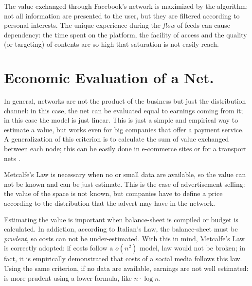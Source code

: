 \documentclass[12pt, a4page]{article}
\begin{document}
The value exchanged through Facebook's network is maximized by the algorithm: not all information are presented to the user, but they are filtered according to personal interests.
The unique experience during the \textit{flow} of feeds can cause dependency: the time spent on the platform, the facility of access and the quality (or targeting) of contents are so high that saturation is not easily reach. \newline

\section{Economic Evaluation of a Net.}
In general, networks are not the product of the business but just the distribution channel: in this case, the net can be evaluated equal to earnings coming from it; in this case the model is just linear.
This is just a simple and empirical way to estimate a value, but works even for big companies that offer a payment service. \newline
A generalization of this criterion is to calculate the sum of value exchanged between each node; this can be easily done in e-commerce sites or for a transport nets\cite{Weinman}
. \newline

Metcalfe's Law is necessary when no or small data are available, so the value can not be known and can be just estimate.
This is the case of advertisement selling: the value of the space is not known, but companies have to define a price according to the distribution that the advert may have in the network. \newline

Estimating the value is important when balance-sheet is compiled or budget is calculated. In addiction, according to Italian's Law, the balance-sheet must be \textit{prudent}, so costs can not be under-estimated.
With this in mind, Metcalfe's Law is correctly adopted: if costs follow a $o(n^2)$ model, law would not be broken; in fact, it is empirically demonstrated\cite{Wechat} that costs of a social media follows this law.
Using the same criterion, if no data are available, earnings are not well estimated: is more prudent using a lower formula, like $n \cdot \log{n}$. \newline
\end{document}

